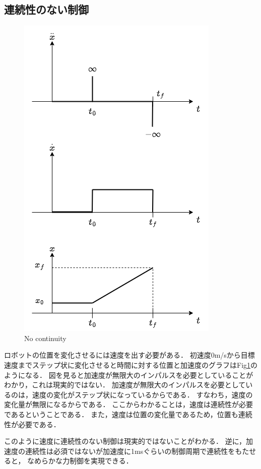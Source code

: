 
\subsection{連続性のない制御}

\begin{figure}[H]
  \centering
 \includegraphics[keepaspectratio, scale=0.8]
      {images/png/inpulse.drawio.png}
 \caption{No continuity}
 \label{Fig:Step}
\end{figure}

ロボットの位置を変化させるには速度を出す必要がある．
初速度0m/sから目標速度までステップ状に変化させると時間に対する位置と加速度のグラフはFig\ref{Fig:Step}のようになる．
図を見ると加速度が無限大のインパルスを必要としていることがわかり，これは現実的ではない．
加速度が無限大のインパルスを必要としているのは，速度の変化がステップ状になっているからである．
すなわち，速度の変化量が無限になるからである．
ここからわかることは，速度は連続性が必要であるということである．
また，速度は位置の変化量であるため，位置も連続性が必要である．

このように速度に連続性のない制御は現実的ではないことがわかる．
逆に，加速度の連続性は必須ではないが加速度に1msぐらいの制御周期で連続性をもたせると，
なめらかな力制御を実現できる．

\newpage
